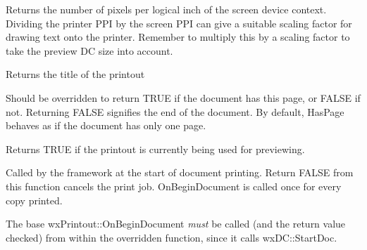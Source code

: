 
\label{wxprintoutgetppiscreen}


Returns the number of pixels per logical inch of the screen device context.
Dividing the printer PPI by the screen PPI can give a suitable scaling
factor for drawing text onto the printer. Remember to multiply
this by a scaling factor to take the preview DC size into account.

\label{wxprintoutgettitle}


Returns the title of the printout



\label{wxprintouthaspage}


Should be overridden to return TRUE if the document has this page, or FALSE
if not. Returning FALSE signifies the end of the document. By default,
HasPage behaves as if the document has only one page.

\label{wxprintoutispreview}


Returns TRUE if the printout is currently being used for previewing.

\label{wxprintoutonbegindocument}


Called by the framework at the start of document printing. Return FALSE from
this function cancels the print job. OnBeginDocument is called once for every
copy printed.

The base wxPrintout::OnBeginDocument {\it must} be called (and the return value
checked) from within the overridden function, since it calls wxDC::StartDoc.



